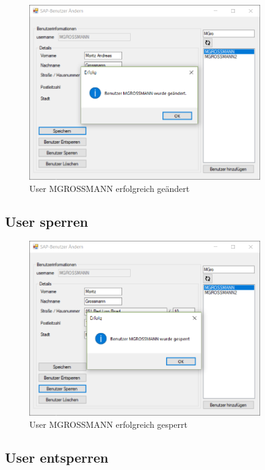 \begin{figure}[h]
	\begin{center}
		\includegraphics[width=10cm]{images/User_Changed.png}
	\end{center}
	\caption{User MGROSSMANN erfolgreich geändert}
	\label{fig:user_change}
\end{figure}

\subsection{User sperren}

\begin{figure}[h]
	\begin{center}
		\includegraphics[width=10cm]{images/User_Locked.png}
	\end{center}
	\caption{User MGROSSMANN erfolgreich gesperrt}
	\label{fig:user_lock}
\end{figure}

\subsection{User entsperren}

